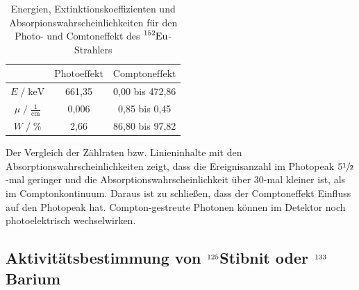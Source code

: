 \begin{table}
  \centering
  \caption{Energien, Extinktionskoeffizienten und Absorpionswahrscheinlichkeiten für den Photo- und Comtoneffekt des $\ce{^{152}Eu}$-Strahlers}
  \label{tab:mess3}
  \begin{tabular}{c c c }
  \toprule
  $ $ & $\text{Photoeffekt}$ & $\text{Comptoneffekt}$ \\
  \midrule
  $E \;/\; \si{\kilo\eV}$                 & 661,35 & 0,00 bis 472,86  \\
  $\mu \;/\; \frac{1}{\si{\centi\meter}}$ & 0,006  & 0,85 bis 0,45 \\
  $W \;/\; \si{\percent}$                 & 2,66   & 86,80 bis 97,82 \\
  \bottomrule
  \end{tabular}
\end{table}

Der Vergleich der Zählraten bzw. Linieninhalte mit den Absorptionswahrscheinlichkeiten zeigt, dass die Ereignisanzahl im Photopeak 
$5 \sfrac{1}{2}$-mal geringer und die Absorptionswahrscheinlichkeit über $30$-mal kleiner ist, als im Comptonkontinuum.
Daraus ist zu schließen, dass der Comptoneffekt Einfluss auf den Photopeak hat. Compton-gestreute Photonen können im 
Detektor noch photoelektrisch wechselwirken.


\subsection{Aktivitätsbestimmung von  $\ce{^{125}}$Stibnit oder  $\ce{^{133}}$Barium }




